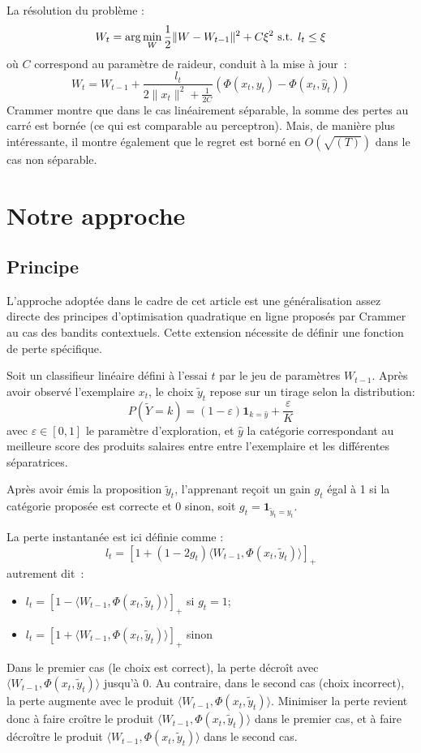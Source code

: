 \documentclass[twocolumn]{article}
\begin{document}
La résolution du problème :
$$W_{t} = \arg \min_W \frac{1}{2} \| W - W_{t-1}\|^2 + C \xi^2 \hbox{ s.t. } l_t \leq \xi$$
où $C$ correspond au paramètre de raideur, conduit à la mise à jour~:
$$W_{t} =  W_{t-1} + \frac{l_t}{2\|x_t\|^2 + \frac{1}{2C}} (\Phi(x_t,y_t) - \Phi(x_t,\hat{y}_t))$$
Crammer montre que dans le cas linéairement séparable, la somme des pertes au carré est bornée (ce qui est comparable au perceptron). Mais, de manière plus intéressante, il montre également que le regret est  borné en $O(\sqrt{(T)})$ dans le cas non séparable.  

\section{Notre approche}

\subsection{Principe}
L'approche adoptée dans le cadre de cet article est une généralisation assez directe des principes d'optimisation quadratique en ligne proposés par Crammer au cas des bandits contextuels. Cette extension nécessite de définir une fonction de perte spécifique. 

Soit un classifieur linéaire défini à l'essai $t$ par le jeu de paramètres $W_{t-1}$. Après avoir observé l'exemplaire $x_t$, le choix $\tilde{y}_t$ repose sur un tirage selon la distribution: $$P(\tilde{Y}=k) = (1 - \varepsilon) \mathbf{1}_{k = \hat{y}} + \frac{\varepsilon}{K} $$ avec $\varepsilon \in [0,1]$ le paramètre d'exploration, et $\hat{y}$ la catégorie correspondant au meilleure score des produits salaires entre entre l'exemplaire et les différentes séparatrices.  

Après avoir émis la proposition $\tilde{y}_t$, l'apprenant reçoit un gain $g_t$ égal à 1 si la catégorie proposée est correcte et 0 sinon, soit $g_t = \mathbf{1}_{\tilde{y}_t=y_t}$. 

La perte instantanée est ici définie comme :
$$l_t = [1 + (1 - 2 g_t) \langle W_{t-1}, \Phi(x_t,\tilde{y}_t)\rangle]_+$$
autrement dit~:
\begin{itemize}
	\item[] $l_t = [1 - \langle W_{t-1}, \Phi(x_t,\tilde{y}_t)\rangle]_+$ si $g_t=1$;
	\item[] $l_t = [1 + \langle W_{t-1}, \Phi(x_t,\tilde{y}_t)\rangle]_+$ sinon
\end{itemize}
Dans le premier cas (le choix est correct), la perte décroît avec $\langle W_{t-1}, \Phi(x_t,\tilde{y}_t)\rangle$ jusqu'à 0. Au contraire, dans le second cas (choix incorrect), la perte augmente avec le produit $\langle W_{t-1}, \Phi(x_t,\tilde{y}_t)\rangle$.
Minimiser la perte revient donc à faire croître le produit $\langle W_{t-1}, \Phi(x_t,\tilde{y}_t)\rangle$ dans le premier cas, et à faire décroître le produit $\langle W_{t-1}, \Phi(x_t,\tilde{y}_t)\rangle$  dans le second cas.
\end{document}
